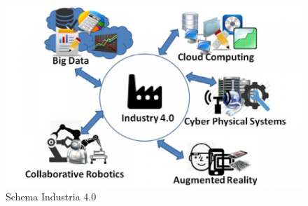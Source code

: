 \documentclass[12pt, a4paper, oneside]{book}
\begin{document}
\begin{figure}[H]
	\centering
	\includegraphics[width=13cm]{Immagini/IND40}
	\caption{Schema Industria 4.0}
	\label{HMI40}
\end{figure}
\end{document}
